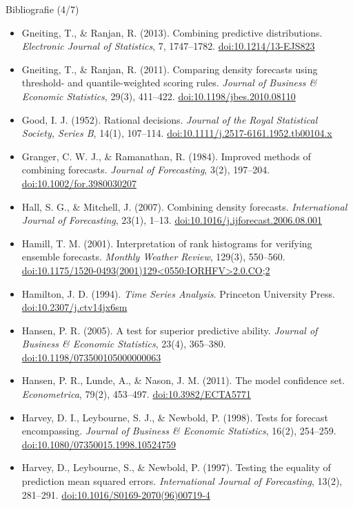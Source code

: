 \begin{frame}{Bibliografie (4/7)}
\itemsize{\tiny}
\begin{itemize}
    \item Gneiting, T., \& Ranjan, R. (2013). Combining predictive distributions. \textit{Electronic Journal of Statistics}, 7, 1747--1782. \href{https://doi.org/10.1214/13-EJS823}{doi:10.1214/13-EJS823}
    \item Gneiting, T., \& Ranjan, R. (2011). Comparing density forecasts using threshold- and quantile-weighted scoring rules. \textit{Journal of Business \& Economic Statistics}, 29(3), 411--422. \href{https://doi.org/10.1198/jbes.2010.08110}{doi:10.1198/jbes.2010.08110}
    \item Good, I. J. (1952). Rational decisions. \textit{Journal of the Royal Statistical Society, Series B}, 14(1), 107--114. \href{https://doi.org/10.1111/j.2517-6161.1952.tb00104.x}{doi:10.1111/j.2517-6161.1952.tb00104.x}
    \item Granger, C. W. J., \& Ramanathan, R. (1984). Improved methods of combining forecasts. \textit{Journal of Forecasting}, 3(2), 197--204. \href{https://doi.org/10.1002/for.3980030207}{doi:10.1002/for.3980030207}
    \item Hall, S. G., \& Mitchell, J. (2007). Combining density forecasts. \textit{International Journal of Forecasting}, 23(1), 1--13. \href{https://doi.org/10.1016/j.ijforecast.2006.08.001}{doi:10.1016/j.ijforecast.2006.08.001}
    \item Hamill, T. M. (2001). Interpretation of rank histograms for verifying ensemble forecasts. \textit{Monthly Weather Review}, 129(3), 550--560. \href{https://doi.org/10.1175/1520-0493(2001)129\%3C0550:IORHFV\%3E2.0.CO;2}{doi:10.1175/1520-0493(2001)129\textless{}0550:IORHFV\textgreater{}2.0.CO;2}
    \item Hamilton, J. D. (1994). \textit{Time Series Analysis}. Princeton University Press. \href{https://doi.org/10.2307/j.ctv14jx6sm}{doi:10.2307/j.ctv14jx6sm}
    \item Hansen, P. R. (2005). A test for superior predictive ability. \textit{Journal of Business \& Economic Statistics}, 23(4), 365--380. \href{https://doi.org/10.1198/073500105000000063}{doi:10.1198/073500105000000063}
    \item Hansen, P. R., Lunde, A., \& Nason, J. M. (2011). The model confidence set. \textit{Econometrica}, 79(2), 453--497. \href{https://doi.org/10.3982/ECTA5771}{doi:10.3982/ECTA5771}
    \item Harvey, D. I., Leybourne, S. J., \& Newbold, P. (1998). Tests for forecast encompassing. \textit{Journal of Business \& Economic Statistics}, 16(2), 254--259. \href{https://doi.org/10.1080/07350015.1998.10524759}{doi:10.1080/07350015.1998.10524759}
    \item Harvey, D., Leybourne, S., \& Newbold, P. (1997). Testing the equality of prediction mean squared errors. \textit{International Journal of Forecasting}, 13(2), 281--291. \href{https://doi.org/10.1016/S0169-2070(96)00719-4}{doi:10.1016/S0169-2070(96)00719-4}
\end{itemize}
\end{frame}

